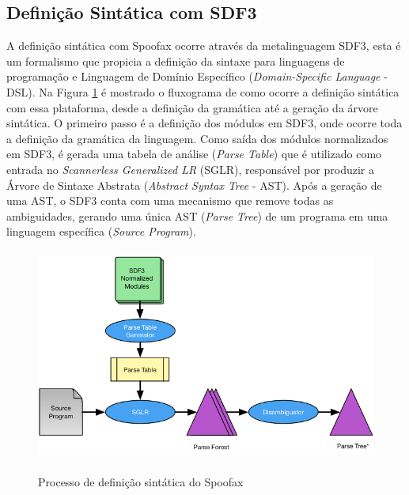 \subsection{Definição Sintática com SDF3}

A definição sintática com Spoofax ocorre através da metalinguagem SDF3, esta é um formalismo que propicia a definição da sintaxe para linguagens de programação e Linguagem de Domínio Específico (\textit{Domain-Specific Language} - DSL). Na Figura \ref{fig:parsing} é mostrado o fluxograma de como ocorre a definição sintática com essa plataforma, desde a definição da gramática até a geração da árvore sintática. O primeiro passo é a definição dos módulos em SDF3, onde ocorre toda a definição da gramática da linguagem. Como saída dos módulos normalizados em SDF3, é gerada uma tabela de análise (\textit{Parse Table}) que é utilizado como entrada no \textit{Scannerless Generalized LR} (SGLR), responsável por produzir a Árvore de Sintaxe Abstrata (\textit{Abstract Syntax Tree} - AST). Após a geração de uma AST, o SDF3 conta com uma mecanismo que remove todas as ambiguidades, gerando uma única AST (\textit{Parse Tree}) de um programa em uma linguagem específica (\textit{Source Program}). 

\begin{figure}[h]
\centering
\caption{Processo de definição sintática do Spoofax}
\includegraphics[height=7cm]{figuras/parsing.png}
\label{fig:parsing}
\end{figure}

